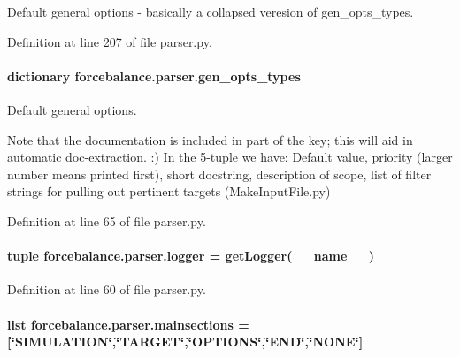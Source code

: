 Default general options -\/ basically a collapsed veresion of gen\-\_\-opts\-\_\-types. 



Definition at line 207 of file parser.\-py.

\hypertarget{namespaceforcebalance_1_1parser_a1ccdff008f4be5f63c068d2a592d69ab}{
\paragraph[{gen\-\_\-opts\-\_\-types}]{\setlength{\rightskip}{0pt plus 5cm}dictionary forcebalance.\-parser.\-gen\-\_\-opts\-\_\-types}}\label{namespaceforcebalance_1_1parser_a1ccdff008f4be5f63c068d2a592d69ab}


Default general options. 

Note that the documentation is included in part of the key; this will aid in automatic doc-\/extraction. \-:) In the 5-\/tuple we have\-: Default value, priority (larger number means printed first), short docstring, description of scope, list of filter strings for pulling out pertinent targets (Make\-Input\-File.\-py) 

Definition at line 65 of file parser.\-py.

\hypertarget{namespaceforcebalance_1_1parser_ab1a411e01f194a0a8fc51b5aaf4b05ac}{
\paragraph[{logger}]{\setlength{\rightskip}{0pt plus 5cm}tuple forcebalance.\-parser.\-logger = get\-Logger(\-\_\-\-\_\-name\-\_\-\-\_\-)}}\label{namespaceforcebalance_1_1parser_ab1a411e01f194a0a8fc51b5aaf4b05ac}


Definition at line 60 of file parser.\-py.

\hypertarget{namespaceforcebalance_1_1parser_a682a3870774181592a7a4784ab108ae6}{
\paragraph[{mainsections}]{\setlength{\rightskip}{0pt plus 5cm}list forcebalance.\-parser.\-mainsections = \mbox{[}\char`\"{}S\-I\-M\-U\-L\-A\-T\-I\-O\-N\char`\"{},\char`\"{}T\-A\-R\-G\-E\-T\char`\"{},\char`\"{}O\-P\-T\-I\-O\-N\-S\char`\"{},\char`\"{}E\-N\-D\char`\"{},\char`\"{}N\-O\-N\-E\char`\"{}\mbox{]}}}\label{namespaceforcebalance_1_1parser_a682a3870774181592a7a4784ab108ae6}


